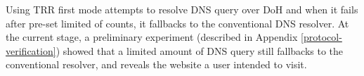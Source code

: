 Using TRR first mode attempts to resolve DNS query over DoH and when it fails after pre-set limited of counts, it fallbacks to the conventional DNS resolver.
At the current stage, a preliminary experiment (described in Appendix \ref{protocol-verification}) showed that a limited amount of DNS query still fallbacks to the conventional resolver, and reveals the website a user intended to visit. 
